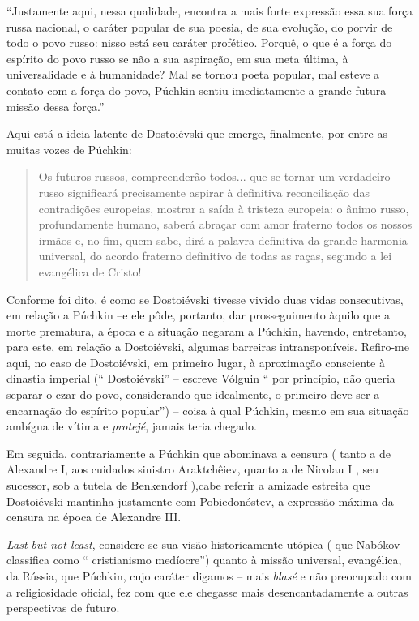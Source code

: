 ``Justamente aqui, nessa qualidade, encontra a mais forte expressão essa
sua força russa nacional, o caráter popular de sua poesia, de sua
evolução, do porvir de todo o povo russo: nisso está seu caráter
profético. Porquê, o que é a força do espírito do povo russo se não a
sua aspiração, em sua meta última, à universalidade e à humanidade? Mal
se tornou poeta popular, mal esteve a contato com a força do povo,
Púchkin sentiu imediatamente a grande futura missão dessa força.''

Aqui está a ideia latente de Dostoiévski que emerge, finalmente, por
entre as muitas vozes de Púchkin:

\begin{quote}
Os futuros russos, compreenderão todos... que se tornar um verdadeiro
russo significará precisamente aspirar à definitiva reconciliação das
contradições europeias, mostrar a saída à tristeza europeia: o ânimo
russo, profundamente humano, saberá abraçar com amor fraterno todos os
nossos irmãos e, no fim, quem sabe, dirá a palavra definitiva da grande
harmonia universal, do acordo fraterno definitivo de todas as raças,
segundo a lei evangélica de Cristo!
\end{quote}

Conforme foi dito, é como se Dostoiévski tivesse vivido duas vidas
consecutivas, em relação a Púchkin --e ele pôde, portanto, dar
prosseguimento àquilo que a morte prematura, a época e a situação
negaram a Púchkin, havendo, entretanto, para este, em relação a
Dostoiévski, algumas barreiras intransponíveis. Refiro-me aqui, no caso
de Dostoiévski, em primeiro lugar, à aproximação consciente à dinastia
imperial (`` Dostoiévski'' -- escreve Vólguin `` por princípio, não
queria separar o czar do povo, considerando que idealmente, o primeiro
deve ser a encarnação do espírito popular'') -- coisa à qual Púchkin,
mesmo em sua situação ambígua de vítima e \emph{protejé}, jamais teria
chegado.

Em seguida, contrariamente a Púchkin que abominava a censura ( tanto a
de Alexandre I, aos cuidados sinistro Araktchêiev, quanto a de Nicolau I
, seu sucessor, sob a tutela de Benkendorf ),cabe referir a amizade
estreita que Dostoiévski mantinha justamente com Pobiedonóstev, a
expressão máxima da censura na época de Alexandre III.

\emph{Last but not least}, considere-se sua visão historicamente utópica
( que Nabókov classifica como `` cristianismo medíocre'') quanto à
missão universal, evangélica, da Rússia, que Púchkin, cujo caráter
digamos -- mais \emph{blasé} e não preocupado com a religiosidade
oficial, fez com que ele chegasse mais desencantadamente a outras
perspectivas de futuro.

